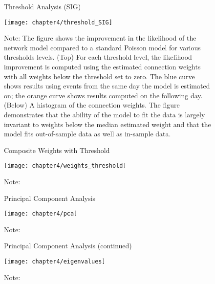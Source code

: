 \begin{figure}[ht!]
\small
\linespread{1}
\centering
\captionsetup{labelsep=colon, font=footnotesize, justification=centerfirst, width=\linewidth}
\caption{Threshold Analysis (SIG)}
\label{fig:threshold_SIG}
\texttt{[image: chapter4/threshold\_SIG]}
\captionsetup{position=below, font=footnotesize, justification=justified, width=\linewidth}
\caption*{Note: The figure shows the improvement in the likelihood of the network model compared to a standard Poisson model for various thresholds levels. (Top) For each threshold level, the likelihood improvement is computed using the estimated connection weights with all weights below the threshold set to zero. The blue curve shows results using events from the same day the model is estimated on; the orange curve shows results computed on the following day. (Below) A histogram of the connection weights. The figure demonstrates that the ability of the model to fit the data is largely invariant to weights below the median estimated weight and that the model fits out-of-sample data as well as in-sample data.}
\end{figure}

\begin{figure}[ht!]
\small
\linespread{1}
\centering
\captionsetup{labelsep=colon, font=footnotesize, justification=centerfirst, width=\linewidth}
\caption{Composite Weights with Threshold}
\label{fig:weights_threshold}
\texttt{[image: chapter4/weights\_threshold]}
\captionsetup{position=below, font=footnotesize, justification=justified, width=\linewidth}
\caption*{Note:}
\end{figure}

\begin{sidewaysfigure}[ht!]
\small
\linespread{1}
\centering
\captionsetup{labelsep=colon, font=footnotesize, justification=centerfirst, width=\linewidth}
\caption{Principal Component Analysis}
\label{fig:pca_chapter4}
\texttt{[image: chapter4/pca]}
\captionsetup{position=below, font=footnotesize, justification=justified, width=\linewidth}
\caption*{Note:}
\end{sidewaysfigure}

\begin{figure}[ht!]
\small
\linespread{1}
\centering
\captionsetup{labelsep=colon, font=footnotesize, justification=centerfirst, width=\linewidth}
\caption{Principal Component Analysis (continued)}
\label{fig:eigenvalues_chapter4}
\texttt{[image: chapter4/eigenvalues]}
\captionsetup{position=below, font=footnotesize, justification=justified, width=\linewidth}
\caption*{Note:}
\end{figure}
